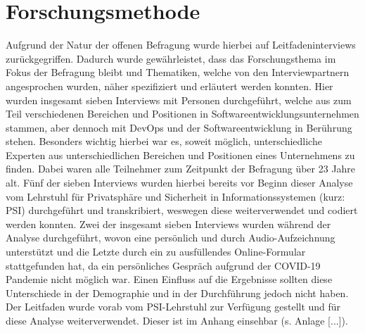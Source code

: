 \chapter{Forschungsmethode} %
\label{Research} %

Aufgrund der Natur der offenen Befragung wurde hierbei auf Leitfadeninterviews zurückgegriffen. Dadurch wurde gewährleistet, dass das Forschungsthema im Fokus der Befragung bleibt und Thematiken, welche von 
den Interviewpartnern angesprochen wurden, näher spezifiziert und erläutert werden konnten. Hier wurden insgesamt sieben Interviews mit Personen durchgeführt, welche aus zum Teil verschiedenen Bereichen und
Positionen in Softwareentwicklungsunternehmen stammen, aber dennoch mit DevOps und der Softwareentwicklung in Berührung stehen. \newline \newline
Besonders wichtig hierbei war es, soweit möglich, unterschiedliche Experten aus unterschiedlichen Bereichen und Positionen eines Unternehmens zu finden. Dabei waren alle Teilnehmer zum Zeitpunkt der Befragung 
über 23 Jahre alt. Fünf der sieben Interviews wurden hierbei bereits vor Beginn dieser Analyse vom Lehrstuhl für Privatsphäre und Sicherheit in Informationssystemen (kurz: PSI) durchgeführt und transkribiert, 
weswegen diese weiterverwendet und codiert werden konnten. Zwei der insgesamt sieben Interviews wurden während der Analyse durchgeführt, wovon eine persönlich und durch Audio-Aufzeichnung unterstützt und die 
Letzte durch ein zu ausfüllendes Online-Formular stattgefunden hat, da ein persönliches Gespräch aufgrund der COVID-19 Pandemie nicht möglich war. Einen Einfluss auf die Ergebnisse sollten diese Unterschiede 
in der Demographie und in der Durchführung jedoch nicht haben. \newline Der Leitfaden wurde vorab vom PSI-Lehrstuhl zur Verfügung gestellt und für diese Analyse weiterverwendet. Dieser ist im Anhang einsehbar 
(s. Anlage [...]).

